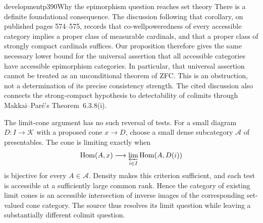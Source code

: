 \begin{dcomment}{development}{p390}{Why the epimorphism question reaches set theory}
There is a definite foundational consequence. The discussion following that corollary, on published pages 574--575, records that co-wellpoweredness of every accessible category implies a proper class of measurable cardinals, and that a proper class of strongly compact cardinals suffices. Our proposition therefore gives the same necessary lower bound for the universal assertion that all accessible categories have accessible epimorphism categories. In particular, that universal assertion cannot be treated as an unconditional theorem of ZFC. This is an obstruction, not a determination of its precise consistency strength. The cited discussion also connects the strong-compact hypothesis to detectability of colimits through Makkai--Par\'e's Theorem~6.3.8(i).

The limit-cone argument has no such reversal of tests. For a small diagram $D:I\to\mathcal K$ with a proposed cone $x\to D$, choose a small dense subcategory $\mathcal A$ of presentables. The cone is limiting exactly when
\[
 \operatorname{Hom}(A,x)\longrightarrow\varprojlim_{i\in I}\operatorname{Hom}(A,D(i))
\]
is bijective for every $A\in\mathcal A$. Density makes this criterion sufficient, and each test is accessible at a sufficiently large common rank. Hence the category of existing limit cones is an accessible intersection of inverse images of the corresponding set-valued cone category. The source thus resolves its limit question while leaving a substantially different colimit question.
\end{dcomment}


